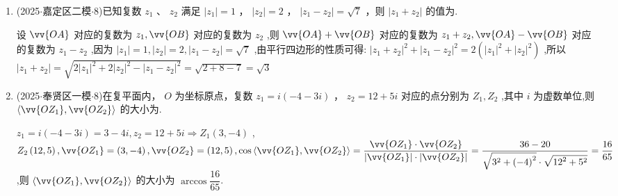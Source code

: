 \begin{enumerate}
    \item (2025$\cdot$嘉定区二模$\cdot$8)已知复数 ${z}_{1}$ 、 ${z}_{2}$ 满足 $\left| {z}_{1}\right|  = 1$ ， $\left| {z}_{2}\right|  = 2$ ， $\left| {{z}_{1} - {z}_{2}}\right|  = \sqrt{7}$ ，则 $\left| {{z}_{1} + {z}_{2}}\right|$ 的值为.
    \begin{jieda}
        设 $\vv{OA}$ 对应的复数为 ${z}_{1},\vv{OB}$ 对应的复数为 ${z}_{2}$ ,则 $\vv{OA} + \vv{OB}$ 对应的复数为 ${z}_{1} + {z}_{2},\vv{OA} - \vv{OB}$ 对应的复数为 ${z}_{1} -  {z}_{2}$ ,因为 $\left| {z}_{1}\right|  = 1,\left| {z}_{2}\right|  = 2,\left| {{z}_{1} - {z}_{2}}\right|  = \sqrt{7}$ ,由平行四边形的性质可得: ${\left| {z}_{1} + {z}_{2}\right| }^{2} + {\left| {z}_{1} - {z}_{2}\right| }^{2} = 2\left( {{\left| {z}_{1}\right| }^{2} + {\left| {z}_{2}\right| }^{2}}\right)$ ,所以 $\left| {{z}_{1} + {z}_{2}}\right|  = \sqrt{2{\left| {z}_{1}\right| }^{2} + 2{\left| {z}_{2}\right| }^{2} - {\left| {z}_{1} - {z}_{2}\right| }^{2}} = \sqrt{2 + 8 - 7} =  \sqrt{3}$
    \end{jieda}

    \item (2025$\cdot$奉贤区一模$\cdot$8)在复平面内， $O$ 为坐标原点，复数 ${z}_{1} = {i}\left( {-4 - {3{i}}}\right)$ ， ${z}_{2} = {12} + {5{i}}$ 对应的点分别为 ${Z}_{1},{Z}_{2}$ ,其中 ${i}$ 为虚数单位,则 $\left\langle  {\vv{O{Z}_{1}},\vv{O{Z}_{2}}}\right\rangle$ 的大小为.
    \begin{jieda}
        ${z}_{1} = {i}\left( {-4 - 3{i}}\right)  = 3 - 4{i},{z}_{2} = {12} + 5{i} \Longrightarrow  {Z}_{1}\left( {3, - 4}\right)$ , ${Z}_{2}\left( {{12},5}\right) ,\vv{O{Z}_{1}} = \left( {3, - 4}\right) ,\vv{O{Z}_{2}} = \left( {{12},5}\right) ,\cos \left\langle  {\vv{O{Z}_{1}},\vv{O{Z}_{2}}}\right\rangle   =  \dfrac{\vv{O{Z}_{1}} \cdot  \vv{O{Z}_{2}}}{\left| \vv{O{Z}_{1}}\right|  \cdot  \left| \vv{O{Z}_{2}}\right| } = \dfrac{{36} - {20}}{\sqrt{{3}^{2} + {\left( -4\right) }^{2}} \cdot  \sqrt{{12}^{2} + {5}^{2}}} = \dfrac{16}{65}$ ,则 $\left\langle  {\vv{O{Z}_{1}},\vv{O{Z}_{2}}}\right\rangle$ 的大小为 $\arccos \dfrac{16}{65}$.
    \end{jieda}


\end{enumerate}
